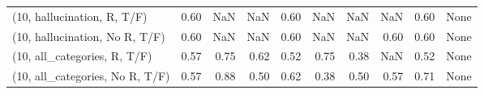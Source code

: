 \begin{table*}[h!]
\begin{adjustbox}{width=2\columnwidth,center}
\begin{tabular}{lrrr|rrr|rrr}
(10, hallucination, R, T/F)           &                      0.60 &                   NaN &                       NaN &                          0.60 &                       NaN &                           NaN &                                    NaN &                               0.60 &                                  None \\
(10, hallucination, No R, T/F)        &                      0.60 &                   NaN &                       NaN &                          0.60 &                       NaN &                           NaN &                                   0.60 &                               0.60 &                                  None \\
(10, all\_categories, R, T/F)          &                      0.57 &                  0.75 &                      0.62 &                          0.52 &                      0.75 &                          0.38 &                                    NaN &                               0.52 &                                  None \\
(10, all\_categories, No R, T/F)       &                      0.57 &                  0.88 &                      0.50 &                          0.62 &                      0.38 &                          0.50 &                                   0.57 &                               0.71 &                                  None \\




\end{tabular}
\end{adjustbox}
\end{table*}
